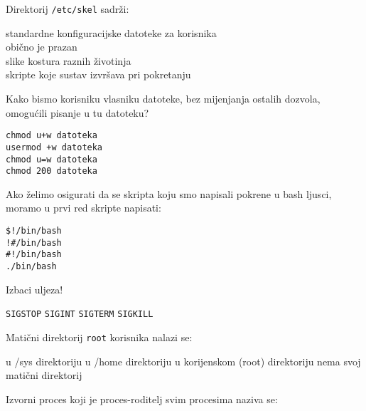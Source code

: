 \documentclass[a4paper,11pt]{exam}
\newcommand{\shell}[1]{\texttt{#1}}
\begin{document}
\begin{questions}
	\question
	Direktorij \shell{/etc/skel} sadrži:
	
	\begin{oneparchoices}
		\CorrectChoice standardne konfiguracijske datoteke za korisnika \\
		\choice obično je prazan \\
		\choice slike kostura raznih životinja \\
		\choice skripte koje sustav izvršava pri pokretanju
	\end{oneparchoices}

	\question
	Kako bismo korisniku vlasniku datoteke, bez mijenjanja ostalih dozvola, omogućili pisanje u tu datoteku?
	
	\begin{oneparchoices}
		\CorrectChoice \shell{chmod u+w datoteka} \\
		\choice \shell{usermod +w datoteka} \\
		\choice \shell{chmod u=w datoteka} \\
		\choice \shell{chmod 200 datoteka} \\
	\end{oneparchoices}

	\question
	Ako želimo osigurati da se skripta koju smo napisali pokrene u bash ljusci, moramo u prvi red skripte napisati:
	
	\begin{oneparchoices}
		\choice \shell{\$!/bin/bash} \\ 
		\choice \shell{!\#/bin/bash} \\ 
		\CorrectChoice \shell{\#!/bin/bash} \\ 
		\choice \shell{./bin/bash}
	\end{oneparchoices}
	
	\question
	Izbaci uljeza!
	
	\begin{oneparchoices}
		\CorrectChoice \shell{SIGSTOP} 
		\choice \shell{SIGINT} 
		\choice \shell{SIGTERM} 
		\choice \shell{SIGKILL}
	\end{oneparchoices}
	
	\question
	Matični direktorij \shell{root} korisnika nalazi se:
	
	\begin{oneparchoices}
		\choice u /sys direktoriju
		\choice u /home direktoriju
		\CorrectChoice u korijenskom (root) direktoriju
		\choice nema svoj matični direktorij
	\end{oneparchoices}
	
	\question
	Izvorni proces koji je proces-roditelj svim procesima naziva se:
	

\end{questions}
\end{document}
